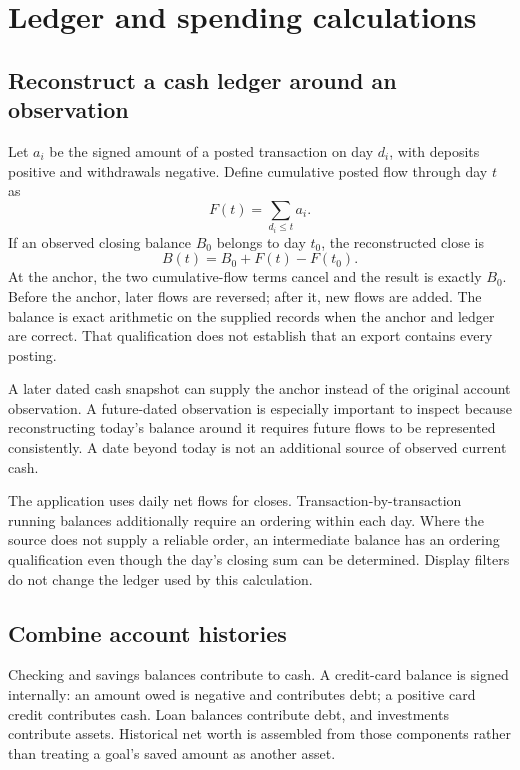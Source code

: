 \chapter{Ledger and spending calculations}\label{ch:ledger-methods}
\section{Reconstruct a cash ledger around an observation}
Let \(a_i\) be the signed amount of a posted transaction on day \(d_i\), with deposits positive and withdrawals negative. Define cumulative posted flow through day \(t\) as
\[
 F(t)=\sum_{d_i\leq t}a_i.
\]
If an observed closing balance \(B_0\) belongs to day \(t_0\), the reconstructed close is
\begin{equation}\label{eq:anchor}
 B(t)=B_0+F(t)-F(t_0).
\end{equation}
At the anchor, the two cumulative-flow terms cancel and the result is exactly \(B_0\). Before the anchor, later flows are reversed; after it, new flows are added. The balance is exact arithmetic on the supplied records when the anchor and ledger are correct. That qualification does not establish that an export contains every posting.

A later dated cash snapshot can supply the anchor instead of the original account observation. A future-dated observation is especially important to inspect because reconstructing today's balance around it requires future flows to be represented consistently. A date beyond today is not an additional source of observed current cash.

The application uses daily net flows for closes. Transaction-by-transaction running balances additionally require an ordering within each day. Where the source does not supply a reliable order, an intermediate balance has an ordering qualification even though the day's closing sum can be determined. Display filters do not change the ledger used by this calculation.

\section{Combine account histories}
Checking and savings balances contribute to cash. A credit-card balance is signed internally: an amount owed is negative and contributes debt; a positive card credit contributes cash. Loan balances contribute debt, and investments contribute assets. Historical net worth is assembled from those components rather than treating a goal's saved amount as another asset.


